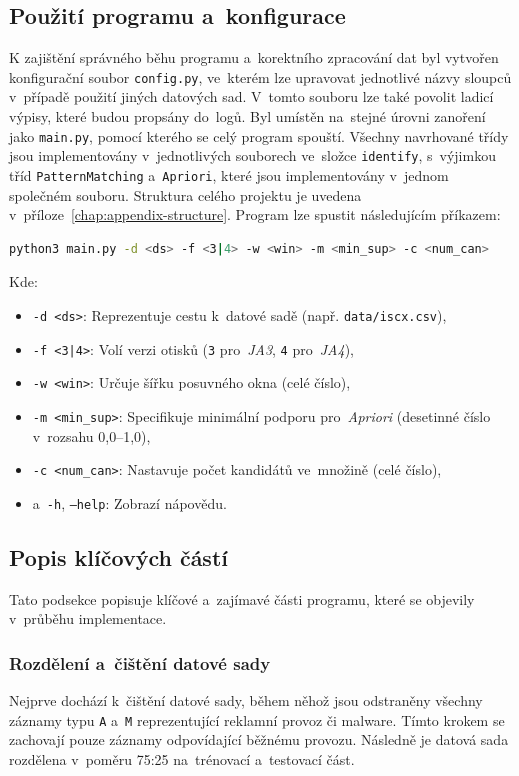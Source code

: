 \subsection{Použití programu a~konfigurace}
K zajištění správného běhu programu a~korektního zpracování dat byl vytvořen konfigurační soubor \texttt{config.py}, ve~kterém lze upravovat jednotlivé názvy sloupců v~případě použití jiných datových sad. V~tomto souboru lze také povolit ladicí výpisy, které budou propsány do~logů. Byl umístěn na~stejné úrovni zanoření jako \texttt{main.py}, pomocí kterého se celý program spouští. Všechny navrhované třídy jsou implementovány v~jednotlivých souborech ve~složce \texttt{identify}, s~výjimkou tříd \texttt{PatternMatching} a~\texttt{Apriori}, které jsou implementovány v~jednom společném souboru. Struktura celého projektu je uvedena v~příloze~\ref{chap:appendix-structure}.
Program lze spustit následujícím příkazem:

\begin{lstlisting}[language=bash]
python3 main.py -d <ds> -f <3|4> -w <win> -m <min_sup> -c <num_can>
\end{lstlisting}

Kde:
\begin{itemize}
	\item \texttt{-d <ds>}: Reprezentuje cestu k~datové sadě (např. \texttt{data/iscx.csv}),
	\item \texttt{-f <3|4>}: Volí verzi otisků (\texttt{3} pro~\textit{JA3}, \texttt{4} pro~\textit{JA4}),
	\item \texttt{-w <win>}: Určuje šířku posuvného okna (celé číslo),
	\item \texttt{-m <min\_sup>}: Specifikuje minimální podporu pro~\textit{Apriori} (desetinné číslo v~rozsahu 0{,}0–1{,}0),
	\item \texttt{-c <num\_can>}: Nastavuje počet kandidátů ve~množině (celé číslo), 
	\item a~\texttt{-h}, \texttt{--help}: Zobrazí nápovědu.
\end{itemize}

\subsection{Popis klíčových částí}
\label{subsec:klicove}
Tato podsekce popisuje klíčové a~zajímavé části programu, které se objevily v~průběhu implementace. 

\subsubsection{Rozdělení a~čištění datové sady}
Nejprve dochází k~čištění datové sady, během něhož jsou odstraněny všechny záznamy typu \texttt{A} a~\texttt{M} reprezentující reklamní provoz či malware. Tímto krokem se zachovají pouze záznamy odpovídající běžnému provozu. Následně je datová sada rozdělena v~poměru 75:25 na~trénovací a~testovací část.

